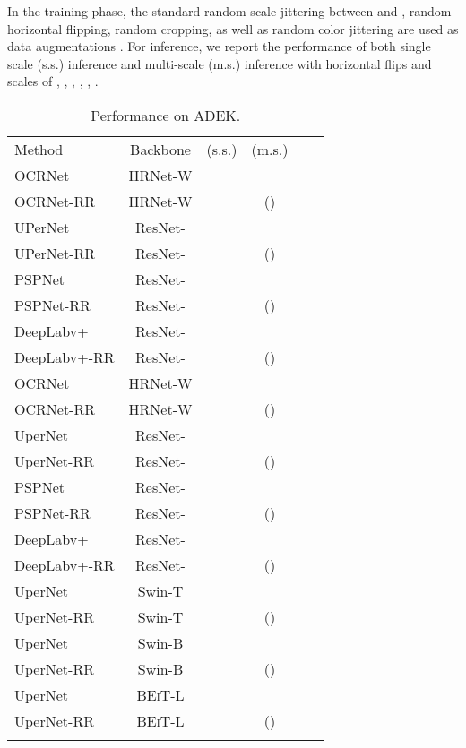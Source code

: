 \documentclass[final]{cvpr}
\begin{document}
In the training phase, the standard random scale jittering between  and , random horizontal flipping, random cropping, as well as random color jittering are used as data augmentations \cite{mmseg2020}. For inference, we report the performance of both single scale (s.s.) inference and multi-scale (m.s.) inference with horizontal flips and
scales of , , , , , .



\begin{table}[t]
	\centering
	\setlength{\tabcolsep}{2.0pt}
	\caption{Performance on ADEK.}
	\resizebox{1.0\linewidth}{!}
	{
		\begin{tabular}{l|ccccc}
			\shline
			Method &Backbone  &(s.s.) &(m.s.) \\
			\shline
			OCRNet              &HRNet-W   & & \\
			OCRNet-RR           &HRNet-W   & &() \\
			UPerNet             &ResNet-  & & \\
			UPerNet-RR          &ResNet-  & &() \\
			PSPNet              &ResNet-  & & \\ 
			PSPNet-RR           &ResNet-  & &() \\ 
			DeepLabv+        &ResNet-  & & \\
			DeepLabv+-RR     &ResNet-  & &() \\
			\shline
			OCRNet              &HRNet-W   & & \\
			OCRNet-RR           &HRNet-W   & &() \\
			UperNet             &ResNet- & & \\
			UperNet-RR          &ResNet- & &() \\
			PSPNet              &ResNet- & & \\
			PSPNet-RR           &ResNet- & &() \\
            DeepLabv+        &ResNet- & & \\
			DeepLabv+-RR     &ResNet- & &() \\
			\shline
			UperNet       &Swin-T       & & \\
			UperNet-RR    &Swin-T       & &() \\
			UperNet       &Swin-B\dag   & & \\
			UperNet-RR    &Swin-B\dag   & &() \\
			\shline
			UperNet       &\textsc{BEiT}-L & & \\
			UperNet-RR    &\textsc{BEiT}-L & &() \\
			\shline
		\end{tabular}
	}
	\label{tab:main_ade20k}
	\vspace{-0.2in}
\end{table}
\end{document}
